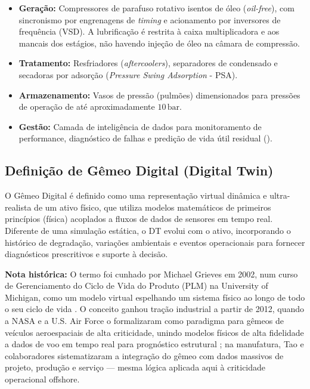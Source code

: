 \documentclass[12pt,a4paper]{article}
\numberwithin{equation}{section}
\numberwithin{table}{section}
\numberwithin{figure}{section}
\begin{document}
{	\begin{itemize}
		\item \textbf{Geração:} Compressores de parafuso rotativo isentos de óleo (\textit{oil-free}), com sincronismo por engrenagens de \textit{timing} e acionamento por inversores de frequência (VSD). A lubrificação é restrita à caixa multiplicadora e aos mancais dos estágios, não havendo injeção de óleo na câmara de compressão.
		\item \textbf{Tratamento:} Resfriadores (\textit{aftercoolers}), separadores de condensado e secadoras por adsorção (\textit{Pressure Swing Adsorption} - PSA).
		\item \textbf{Armazenamento:} Vasos de pressão (pulmões) dimensionados para pressões de operação de até aproximadamente $10\,\text{bar}$.
		\item \textbf{Gestão:} Camada de inteligência de dados para monitoramento de performance, diagnóstico de falhas e predição de vida útil residual ().
	\end{itemize}
	
	\subsection{\textbf{Definição de Gêmeo Digital (Digital Twin)}}
	O Gêmeo Digital é definido como uma representação virtual dinâmica e ultra-realista de um ativo físico, que utiliza modelos matemáticos de primeiros princípios (física) acoplados a fluxos de dados de sensores em tempo real. Diferente de uma simulação estática, o DT evolui com o ativo, incorporando o histórico de degradação, variações ambientais e eventos operacionais para fornecer diagnósticos prescritivos e suporte à decisão.

	\textbf{Nota histórica:} O termo foi cunhado por Michael Grieves em 2002, num curso de Gerenciamento do Ciclo de Vida do Produto (PLM) na University of Michigan, como um modelo virtual espelhando um sistema físico ao longo de todo o seu ciclo de vida \cite{grieves}. O conceito ganhou tração industrial a partir de 2012, quando a NASA e a U.S. Air Force o formalizaram como paradigma para gêmeos de veículos aeroespaciais de alta criticidade, unindo modelos físicos de alta fidelidade a dados de voo em tempo real para prognóstico estrutural \cite{glaessgen}; na manufatura, Tao e colaboradores sistematizaram a integração do gêmeo com dados massivos de projeto, produção e serviço \cite{tao} — mesma lógica aplicada aqui à criticidade operacional offshore.

}
\end{document}
